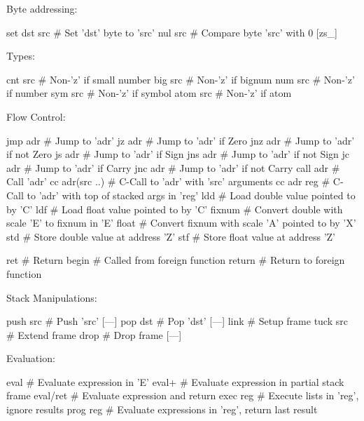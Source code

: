 Byte addressing:
\begin{wideverbatim}
set dst src       # Set 'dst' byte to 'src'
nul src           # Compare byte 'src' with 0 [zs_]
\end{wideverbatim}

Types:
\begin{wideverbatim}
cnt src           # Non-'z' if small number
big src           # Non-'z' if bignum
num src           # Non-'z' if number
sym src           # Non-'z' if symbol
atom src          # Non-'z' if atom
\end{wideverbatim}

Flow Control:

\begin{wideverbatim}
jmp adr           # Jump to 'adr'
jz adr            # Jump to 'adr' if Zero
jnz adr           # Jump to 'adr' if not Zero
js adr            # Jump to 'adr' if Sign
jns adr           # Jump to 'adr' if not Sign
jc adr            # Jump to 'adr' if Carry
jnc adr           # Jump to 'adr' if not Carry
call adr          # Call 'adr'
cc adr(src ..)    # C-Call to 'adr' with 'src' arguments
cc adr reg        # C-Call to 'adr' with top of stacked args in 'reg'
ldd               # Load double value pointed to by 'C'
ldf               # Load float value pointed to by 'C'
fixnum            # Convert double with scale 'E' to fixnum in 'E'
float             # Convert fixnum with scale 'A' pointed to by 'X'
std               # Store double value at address 'Z'
stf               # Store float value at address 'Z'

\end{wideverbatim}

\begin{wideverbatim}

ret               # Return
begin             # Called from foreign function
return            # Return to foreign function
\end{wideverbatim}


Stack Manipulations:

\begin{wideverbatim}
push src          # Push 'src' [---]
pop dst           # Pop 'dst' [---]
link              # Setup frame
tuck src          # Extend frame
drop              # Drop frame [---]
\end{wideverbatim}

Evaluation:

\begin{wideverbatim}
eval              # Evaluate expression in 'E'
eval+             # Evaluate expression in partial stack frame
eval/ret          # Evaluate expression and return
exec reg          # Execute lists in 'reg', ignore results
prog reg          # Evaluate expressions in 'reg', return last result
\end{wideverbatim}

